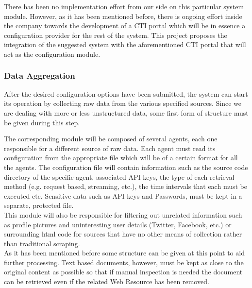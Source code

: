 \documentclass[12pt]{article}
\newcounter{subsubsubsection}[subsubsection]
\begin{document}
There has been no implementation effort from our side on this particular system module. However, as it has been mentioned before, there is ongoing effort inside the company towards the development of a CTI portal which will be in essence a configuration provider for the rest of the system. This project proposes the integration of the suggested system with the aforementioned CTI portal that will act as the configuration module. 


\subsubsection{Data Aggregation}

After the desired configuration options have been submitted, the  system can start its operation by collecting raw data from the various specified sources. Since we are dealing with more or less unstructured data, some first form of structure must be given during this step.


The corresponding module will be composed of several agents, each one responsible for a different source of raw data. Each agent must read its configuration from the appropriate file which will be of a certain format for all the agents. The configuration file will contain information such as the source code directory of the specific agent, associated API keys, the type of each retrieval method (e.g. request based, streaming, etc.), the time intervals that each must be executed etc. Sensitive data such as API keys and Passwords, must be kept in a separate, protected file.
\hfill \break \\
This module will also be responsible for filtering out unrelated information such as profile pictures and uninteresting user details (Twitter, Facebook, etc.) or surrounding html code for sources that have no other means of collection rather than traditional scraping.
\hfill \break \\
As it has been mentioned before some structure can be given at this point to aid further processing. Text based documents, however, must be kept as close to the original content as possible so that if manual inspection is needed the document can be retrieved even if the related Web Resource has been removed.


\end{document}
